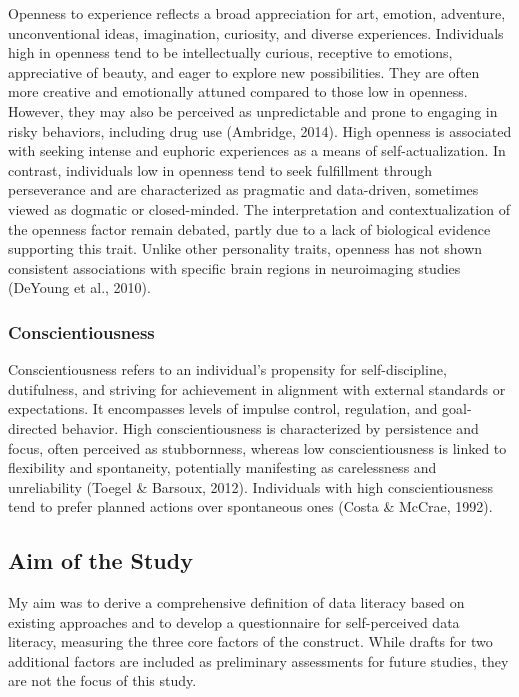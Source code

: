 \documentclass[
  12pt,
  a4paper,
  twoside]{article}
\begin{document}
Openness to experience reflects a broad appreciation for art, emotion, adventure, unconventional ideas, imagination, curiosity, and diverse experiences. Individuals high in openness tend to be intellectually curious, receptive to emotions, appreciative of beauty, and eager to explore new possibilities. They are often more creative and emotionally attuned compared to those low in openness. However, they may also be perceived as unpredictable and prone to engaging in risky behaviors, including drug use (Ambridge, 2014). High openness is associated with seeking intense and euphoric experiences as a means of self-actualization. In contrast, individuals low in openness tend to seek fulfillment through perseverance and are characterized as pragmatic and data-driven, sometimes viewed as dogmatic or closed-minded. The interpretation and contextualization of the openness factor remain debated, partly due to a lack of biological evidence supporting this trait. Unlike other personality traits, openness has not shown consistent associations with specific brain regions in neuroimaging studies (DeYoung et al., 2010).

\subsubsection{Conscientiousness}\label{conscientiousness}

Conscientiousness refers to an individual's propensity for self-discipline, dutifulness, and striving for achievement in alignment with external standards or expectations. It encompasses levels of impulse control, regulation, and goal-directed behavior. High conscientiousness is characterized by persistence and focus, often perceived as stubbornness, whereas low conscientiousness is linked to flexibility and spontaneity, potentially manifesting as carelessness and unreliability (Toegel \& Barsoux, 2012). Individuals with high conscientiousness tend to prefer planned actions over spontaneous ones (Costa \& McCrae, 1992).

\subsection{Aim of the Study}\label{aim-of-the-study}

My aim was to derive a comprehensive definition of data literacy based on existing approaches and to develop a questionnaire for self-perceived data literacy, measuring the three core factors of the construct. While drafts for two additional factors are included as preliminary assessments for future studies, they are not the focus of this study.
\end{document}
